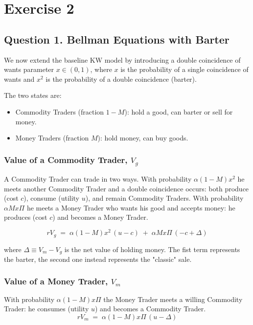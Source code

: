 \documentclass[11pt, a4paper]{article}
\begin{document}

\section*{Exercise 2}
\subsection*{Question 1. Bellman Equations with Barter}

We now extend the baseline KW model by introducing a double coincidence of wants parameter $x \in (0,1)$, where $x$ is the probability of a single coincidence of wants and $x^2$ is the probability of a double coincidence (barter).

The two states are:
\begin{itemize}
  \item Commodity Traders (fraction $1 - M$): hold a good, can barter
        or sell for money.
  \item Money Traders (fraction $M$): hold money, can buy goods.
\end{itemize}

\subsubsection*{Value of a Commodity Trader, $V_g$}

A Commodity Trader can trade in two ways. With probability $\alpha(1-M)x^2$ he meets another Commodity Trader and a double coincidence occurs: both produce (cost $c$), consume (utility $u$), and remain Commodity Traders. With probability $\alpha M x \Pi$ he meets a Money Trader who wants his good and accepts money: he produces (cost $c$) and becomes a Money Trader.

\[
  rV_g \;=\; \alpha(1-M)x^2\,(u-c)
           \;+\; \alpha Mx\Pi\,(-c + \Delta)
\]

where $\Delta \equiv V_m - V_g$ is the net value of holding money. The fist term represents the barter, the second one instead represents the "classic" sale.

\subsubsection*{Value of a Money Trader, $V_m$}

With probability $\alpha(1-M)x\Pi$ the Money Trader meets a willing Commodity Trader: he consumes (utility $u$) and becomes a Commodity Trader.
\[
  rV_m \;=\; \alpha(1-M)x\Pi\,(u - \Delta)
\]
\end{document}
